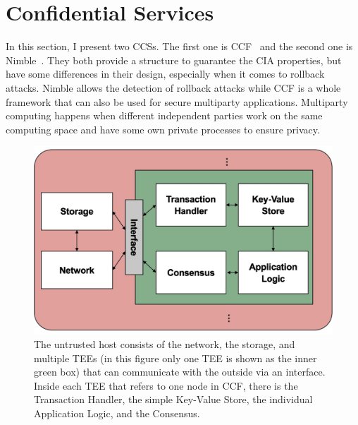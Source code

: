 \section{Confidential Services}
In this section, I present two CCSs. The first one is CCF~\cite{Howard} and the second one is Nimble~\cite{Nimble}. They both provide a structure to guarantee the CIA properties, but have some differences in their design, especially when it comes to rollback attacks. Nimble allows the detection of rollback attacks while CCF is a whole framework that can also be used for secure multiparty applications. Multiparty computing happens when different independent parties work on the same computing space and have some own private processes to ensure privacy.

 \begin{figure}[t]
	\includegraphics[scale=0.14]{pictures/ccf}
	\caption{The untrusted host consists of the network,  the storage, and multiple TEEs (in this figure only one TEE is shown as the inner green box) that can communicate with the outside via an interface. Inside each TEE that refers to one node in CCF, there is the Transaction Handler, the simple Key-Value Store, the individual Application Logic, and the Consensus.}
	\label{ccf}
\end{figure}


